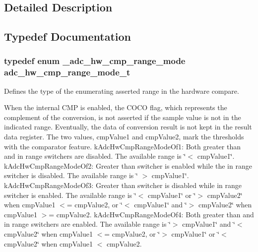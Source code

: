 \subsection{Detailed Description}


\subsection{Typedef Documentation}
\subsubsection[{\texorpdfstring{adc\+\_\+hw\+\_\+cmp\+\_\+range\+\_\+mode\+\_\+t}{adc_hw_cmp_range_mode_t}}]{\setlength{\rightskip}{0pt plus 5cm}typedef enum {\bf \+\_\+adc\+\_\+hw\+\_\+cmp\+\_\+range\+\_\+mode}  {\bf adc\+\_\+hw\+\_\+cmp\+\_\+range\+\_\+mode\+\_\+t}}\hypertarget{group__adc__hal_ga233a744e31dcfed41f7cefadda54b592}{}\label{group__adc__hal_ga233a744e31dcfed41f7cefadda54b592}


Defines the type of the enumerating asserted range in the hardware compare. 

When the internal C\+MP is enabled, the C\+O\+CO flag, which represents the complement of the conversion, is not asserted if the sample value is not in the indicated range. Eventually, the data of conversion result is not kept in the result data register. The two values, cmp\+Value1 and cmp\+Value2, mark the thresholds with the comparator feature. k\+Adc\+Hw\+Cmp\+Range\+Mode\+Of1\+: Both greater than and in range switchers are disabled. The available range is \char`\"{}$<$ cmp\+Value1\char`\"{}. k\+Adc\+Hw\+Cmp\+Range\+Mode\+Of2\+: Greater than switcher is enabled while the in range switcher is disabled. The available range is \char`\"{} $>$ cmp\+Value1\char`\"{}. k\+Adc\+Hw\+Cmp\+Range\+Mode\+Of3\+: Greater than switcher is disabled while in range switcher is enabled. The available range is \char`\"{}$<$ cmp\+Value1\char`\"{} or \char`\"{}$>$ cmp\+Value2\char`\"{} when cmp\+Value1 $<$= cmp\+Value2, or \char`\"{}$<$ cmp\+Value1\char`\"{} and \char`\"{}$>$ cmp\+Value2\char`\"{} when cmp\+Value1 $>$= cmp\+Value2. k\+Adc\+Hw\+Cmp\+Range\+Mode\+Of4\+: Both greater than and in range switchers are enabled. The available range is \char`\"{}$>$ cmp\+Value1\char`\"{} and \char`\"{}$<$ cmp\+Value2\char`\"{} when cmp\+Value1 $<$= cmp\+Value2, or \char`\"{}$>$ cmp\+Value1\char`\"{} or \char`\"{}$<$ cmp\+Value2\char`\"{} when cmp\+Value1 $<$ cmp\+Value2. 

